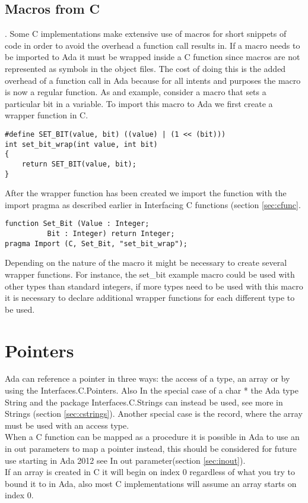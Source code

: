 \subsection{Macros from C}\label{sec:macrosc}.
Some C implementations make extensive use of macros for short snippets of code in order to avoid the overhead a function call results in. If a macro needs to be imported to Ada it must be wrapped inside a C function since macros are not represented as symbols in the object files. The cost of doing this is the added overhead of a function call in Ada because for all intents and purposes the macro is now a regular function. As and example, consider a macro that sets a particular bit in a variable. To import this macro to Ada we first create a wrapper function in C.
\begin{lstlisting}
#define SET_BIT(value, bit) ((value) | (1 << (bit)))
int set_bit_wrap(int value, int bit) 
{ 
	return SET_BIT(value, bit); 
}
\end{lstlisting}
After the wrapper function has been created we import the function with the import pragma as described earlier in Interfacing C functions (section \ref{sec:cfunc}.
\begin{lstlisting}
function Set_Bit (Value : Integer; 
 		  Bit : Integer) return Integer;
pragma Import (C, Set_Bit, "set_bit_wrap");
\end{lstlisting}
Depending on the nature of the macro it might be necessary to create several wrapper functions. For instance, the set_bit example macro could be used with other types than standard integers, if more types need to be used with this macro it is necessary to declare additional wrapper functions for each different type to be used.
\section{Pointers}\label{sec:pointers}
Ada can reference a pointer in three ways: the access of a type, an array or by using the Interfaces.C.Pointers. Also  In the special case of a char * the Ada type String and the package Interfaces.C.Strings can instead be used, see more in Strings (section \ref{sec:cstrings}). Another special case is the record, where the array must be used with an access type.
\\
When a C function can be mapped as a procedure it is possible in Ada to use an in out parameters to map a pointer instead, this should be considered for future use starting in Ada 2012 see In out parameter(section \ref{sec:inout}).
\\
If an array is created in C it will begin on index 0 regardless of what you try to bound it to in Ada, also most C implementations will assume an array starts on index 0.
